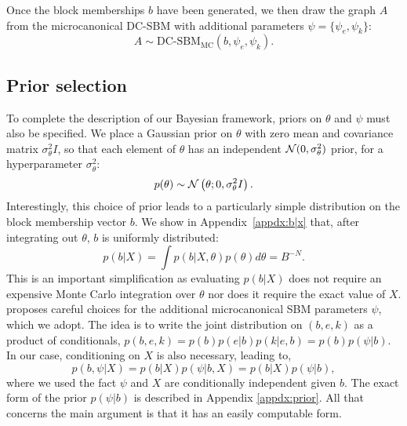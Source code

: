 Once the block memberships $b$ have been generated, we then draw the 
graph $A$ from the microcanonical DC-SBM with additional parameters 
$\psi = \{\psi_e, \psi_k\}$:
%
\begin{equation}
	A \sim \textrm{DC-SBM}_{\textrm{MC}} (b, \psi_e, \psi_k).
	\label{eqn:A-generation}
\end{equation}


\subsection{Prior selection}

To complete the description of our Bayesian framework,
priors on $\theta$ and $\psi$ must also be specified. 
We place a Gaussian prior on $\theta$ with zero mean
and covariance matrix $\sigma^2_\theta I$, so that
each element of $\theta$ has an independent ${\cal N}(0,\sigma_\theta^2)$
prior, for a hyperparameter $\sigma_\theta^2$:
%
\begin{equation}
	p(\theta) \sim \mathcal{N} \left( \theta ; 0, \sigma_\theta^2 I \right).
	\label{eqn:theta-prior}
\end{equation}
%
Interestingly, this choice of prior leads to a particularly
simple distribution on the block membership vector $b$.
We show in Appendix~\ref{appdx:b|x} that,
after integrating out $\theta$,
$b$ is uniformly distributed:
%
\begin{equation}
	p(b | X) = \int p(b | X, \theta) p(\theta) d\theta = B^{-N}.
	\label{eqn:b-pseudo-prior}
\end{equation}
%
This is an important simplification as evaluating $p(b | X)$ does not require an expensive Monte Carlo integration over $\theta$ nor does it require the exact value of $X$. 
\citet{Peixoto-Bayesian-Microcanonical} proposes careful choices for 
the additional microcanonical SBM parameters $\psi$, which we adopt. 
The idea is to write the joint distribution on $(b, e, k)$ as a product of 
conditionals, $p(b, e, k) = p(b) p(e | b) p(k | e, b)= p(b) p(\psi | b)$. 
In our case, conditioning on $X$ is also necessary, leading to,
%
\begin{equation}
	p(b, \psi | X) = p(b | X) p(\psi | b, X) = p(b | X) p(\psi | b),
	\label{eqn:joint-pseudo-prior}
\end{equation}
%
where we used the fact $\psi$ and $X$ are conditionally 
independent given $b$.  The exact form of the prior
$p(\psi|b)$ is described in Appendix \ref{appdx:prior}.
All that concerns the main argument is that it has
an easily computable form.
